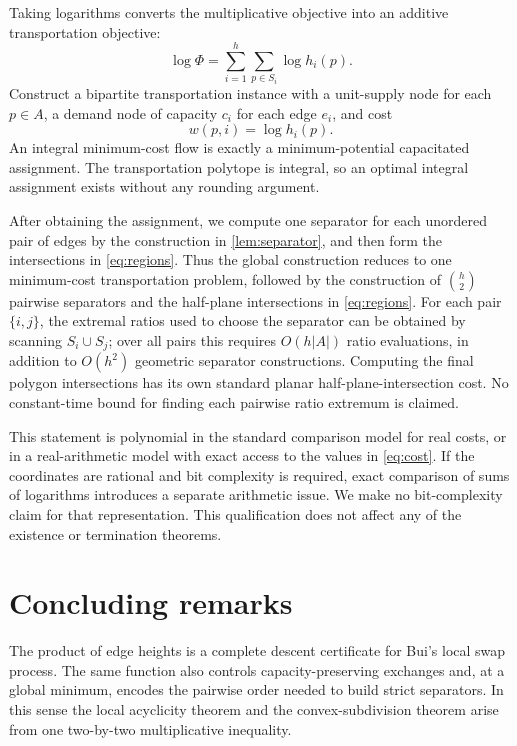 \documentclass[final,5p,times,twocolumn]{elsarticle}
\theoremstyle{definition}
\theoremstyle{remark}
\newcommand{\height}{h}
\newcommand{\Potential}{\Phi}
\begin{document}
Taking logarithms converts the multiplicative objective into an additive transportation objective:
\begin{equation}
\log\Potential
=
\sum_{i=1}^{h}\sum_{p\in S_i}\log\height_i(p).
\label{eq:log-potential}
\end{equation}
Construct a bipartite transportation instance with a unit-supply node for each $p\in A$, a demand node of capacity $c_i$ for each edge $e_i$, and cost
\begin{equation}
w(p,i)=\log\height_i(p).
\label{eq:cost}
\end{equation}
An integral minimum-cost flow is exactly a minimum-potential capacitated assignment. The transportation polytope is integral, so an optimal integral assignment exists without any rounding argument.

After obtaining the assignment, we compute one separator for each unordered pair of edges by the construction in \cref{lem:separator}, and then form the intersections in \eqref{eq:regions}. Thus the global construction reduces to one minimum-cost transportation problem, followed by the construction of $\binom h2$ pairwise separators and the half-plane intersections in \eqref{eq:regions}. For each pair $\{i,j\}$, the extremal ratios used to choose the separator can be obtained by scanning $S_i\cup S_j$; over all pairs this requires $O(h|A|)$ ratio evaluations, in addition to $O(h^2)$ geometric separator constructions. Computing the final polygon intersections has its own standard planar half-plane-intersection cost. No constant-time bound for finding each pairwise ratio extremum is claimed.

This statement is polynomial in the standard comparison model for real costs, or in a real-arithmetic model with exact access to the values in \eqref{eq:cost}. If the coordinates are rational and bit complexity is required, exact comparison of sums of logarithms introduces a separate arithmetic issue. We make no bit-complexity claim for that representation. This qualification does not affect any of the existence or termination theorems.

\section{Concluding remarks}
\label{sec:conclusion}

The product of edge heights is a complete descent certificate for Bui's local swap process. The same function also controls capacity-preserving exchanges and, at a global minimum, encodes the pairwise order needed to build strict separators. In this sense the local acyclicity theorem and the convex-subdivision theorem arise from one two-by-two multiplicative inequality.
\end{document}
